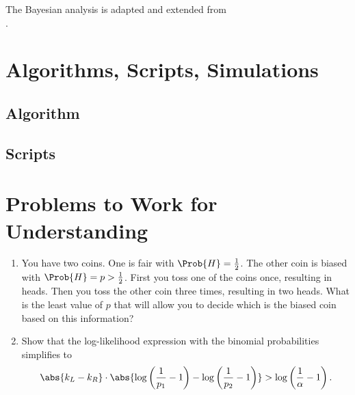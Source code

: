 \documentclass[12pt]{article}
\begin{document}
The Bayesian analysis is adapted and extended from \\
.

\nocite{white17}
\nocite{maclean10}

\hr

\section*{Algorithms, Scripts, Simulations}

\subsection*{Algorithm}

\subsection*{Scripts}



\hr

\section*{Problems to Work for Understanding}
\begin{enumerate}
    \item
        You have two coins.  One is fair with \( \Prob{H} = \frac{1}{2} \).
        The other coin is biased with \( \Prob{H} = p > \frac{1}{2} \).
        First you toss one of the coins once, resulting in heads.  Then
        you toss the other coin three times, resulting in two heads.
        What is the least value of \( p \) that will allow you to decide
        which is the biased coin based on this information?



    \item
        Show that the log-likelihood expression with the binomial
        probabilities simplifies to
        \[
            \abs{k_L - k_R} \cdot \abs{ \log\left( \frac{1}{p_1} - 1
            \right) - \log\left( \frac{1}{p_2} - 1 \right) } > \log
            \left( \frac{1}{\alpha} - 1 \right).
        \]
\end{enumerate}
\end{document}
